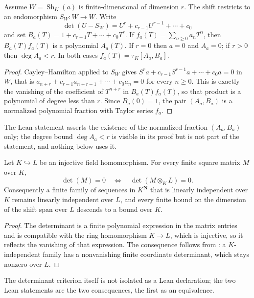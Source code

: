 \begin{proposition}
\label{prop:zla-shift-span-germ}
Assume $W=\operatorname{Sh}_K(a)$ is finite-dimensional of dimension $r$.  The
shift restricts to an endomorphism $S_W:W\to W$.  Write
\[
  \det(U-S_W)=U^r+c_{r-1}U^{r-1}+\cdots+c_0
\]
and set $B_a(T)=1+c_{r-1}T+\cdots+c_0T^r$.  If
$f_a(T)=\sum_{n\geq0}a_nT^n$, then $B_a(T)f_a(T)$ is a polynomial $A_a(T)$.
If $r=0$ then $a=0$ and $A_a=0$; if $r>0$ then $\deg A_a<r$.  In both cases
$f_a(T)=\tau_K[A_a,B_a]$.
\end{proposition}
\begin{proof}
Cayley--Hamilton applied to $S_W$ gives
$S^ra+c_{r-1}S^{r-1}a+\cdots+c_0a=0$ in $W$, that is
$a_{n+r}+c_{r-1}a_{n+r-1}+\cdots+c_0a_n=0$ for every $n\geq0$.  This is
exactly the vanishing of the coefficient of $T^{n+r}$ in $B_a(T)f_a(T)$, so
that product is a polynomial of degree less than $r$.  Since $B_a(0)=1$, the
pair $(A_a,B_a)$ is a normalized polynomial fraction with Taylor series
$f_a$.
\end{proof}

The Lean statement asserts the existence of the normalized fraction
$(A_a,B_a)$ only; the degree bound $\deg A_a<r$ is visible in its proof but
is not part of the statement, and nothing below uses it.

\begin{lemma}
\label{lem:zla-det-scalar-extension}
Let $K\hookrightarrow L$ be an injective field homomorphism.  For every finite
square matrix $M$ over $K$,
\[
  \det(M)=0
  \quad\Longleftrightarrow\quad
  \det(M\otimes_KL)=0.
\]
Consequently a finite family of sequences in $K^{\mathbf N}$ that is linearly
independent over $K$ remains linearly independent over $L$, and every finite
bound on the dimension of the shift span over $L$ descends to a bound over
$K$.
\end{lemma}
\begin{proof}
The determinant is a finite polynomial expression in the matrix entries and is
compatible with the ring homomorphism $K\to L$, which is injective, so it
reflects the vanishing of that expression.  The consequence follows from
: a $K$-independent family has a nonvanishing
finite coordinate determinant, which stays nonzero over $L$.
\end{proof}

The determinant criterion itself is not isolated as a Lean declaration; the
two Lean statements are the two consequences, the first as an equivalence.

